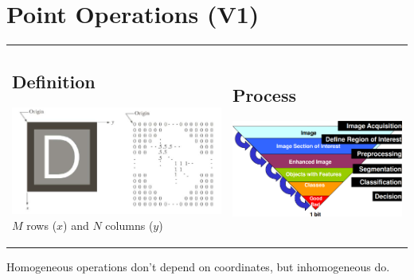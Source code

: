 \section{Point Operations (V1)}
\begin{tabular}{ll}
  \parbox{8cm}{
    \subsection{Definition}
    \includegraphics[width=7cm]{./images/image_definition.png}\\
    $M$ rows ($x$) and $N$ columns ($y$)
    } 
  & \parbox{11cm}{
    \subsection{Process}
    \includegraphics[width=10cm]{./images/image_process.png}
    }
  
\end{tabular}

Homogeneous operations don't depend on coordinates, but inhomogeneous do.





